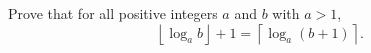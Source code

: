 Prove that for all positive integers $a$ and $b$ with $a>1$,
\[\left\lfloor \log_a b\right\rfloor + 1 = \left\lceil \log_a (b+1) \right\rceil .\]

